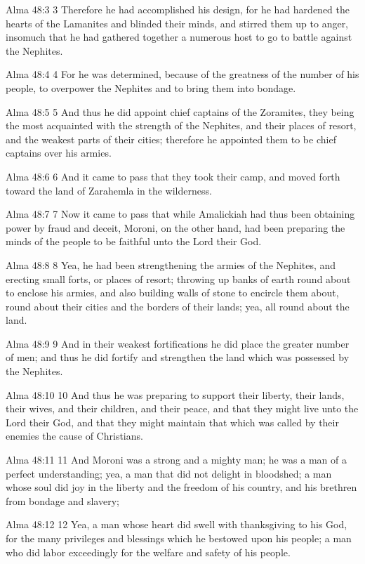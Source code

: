 Alma 48:3
 3 Therefore he had accomplished his design, for he had hardened
the hearts of the Lamanites and blinded their minds, and stirred
them up to anger, insomuch that he had gathered together a
numerous host to go to battle against the Nephites.

Alma 48:4
 4 For he was determined, because of the greatness of the number
of his people, to overpower the Nephites and to bring them into
bondage.

Alma 48:5
 5 And thus he did appoint chief captains of the Zoramites, they
being the most acquainted with the strength of the Nephites, and
their places of resort, and the weakest parts of their cities;
therefore he appointed them to be chief captains over his armies.

Alma 48:6
 6 And it came to pass that they took their camp, and moved forth
toward the land of Zarahemla in the wilderness.

Alma 48:7
 7 Now it came to pass that while Amalickiah had thus been
obtaining power by fraud and deceit, Moroni, on the other hand,
had been preparing the minds of the people to be faithful unto
the Lord their God.

Alma 48:8
 8 Yea, he had been strengthening the armies of the Nephites, and
erecting small forts, or places of resort; throwing up banks of
earth round about to enclose his armies, and also building walls
of stone to encircle them about, round about their cities and the
borders of their lands; yea, all round about the land.

Alma 48:9
 9 And in their weakest fortifications he did place the greater
number of men; and thus he did fortify and strengthen the land
which was possessed by the Nephites.

Alma 48:10
 10 And thus he was preparing to support their liberty, their
lands, their wives, and their children, and their peace, and that
they might live unto the Lord their God, and that they might
maintain that which was called by their enemies the cause of
Christians.

Alma 48:11
 11 And Moroni was a strong and a mighty man; he was a man of a
perfect understanding; yea, a man that did not delight in
bloodshed; a man whose soul did joy in the liberty and the
freedom of his country, and his brethren from bondage and
slavery;

Alma 48:12
 12 Yea, a man whose heart did swell with thanksgiving to his
God, for the many privileges and blessings which he bestowed upon
his people; a man who did labor exceedingly for the welfare and
safety of his people.

